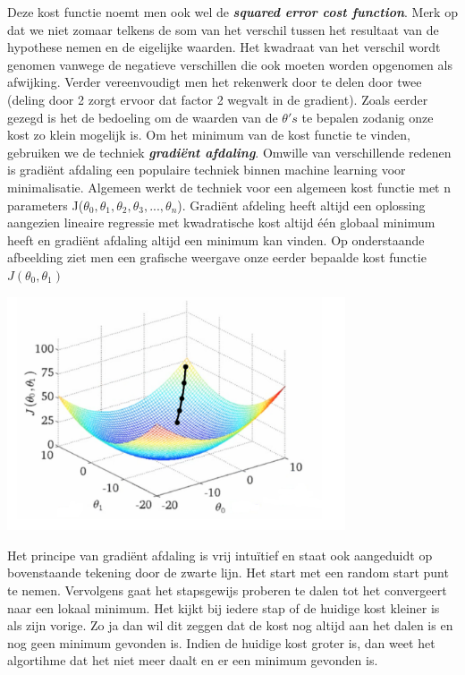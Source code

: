Deze kost functie noemt men ook wel de \textbf{\textit{squared error cost function}}. Merk op dat we niet zomaar telkens de som van het verschil tussen het resultaat van de hypothese nemen en de eigelijke waarden. Het kwadraat van het verschil wordt genomen vanwege de negatieve verschillen die ook moeten worden opgenomen als afwijking. Verder vereenvoudigt men het rekenwerk door te delen door twee (deling door 2 zorgt ervoor dat factor 2 wegvalt in de gradient). 
\newline
Zoals eerder gezegd is het de bedoeling om de waarden van de $\theta's$ te bepalen zodanig onze kost zo klein mogelijk is. Om het minimum van de kost functie te vinden, gebruiken we de techniek \textbf{\textit{gradi\"ent afdaling}}. Omwille van verschillende redenen is gradi\"ent afdaling een populaire techniek binnen machine learning voor minimalisatie. Algemeen werkt de techniek voor een algemeen kost functie met n parameters J($\theta_{0},\theta_{1},\theta_{2},\theta_{3}, ... ,\theta_{n}$). Gradi\"ent afdeling heeft altijd een oplossing aangezien lineaire regressie met kwadratische kost altijd \'e\'en globaal minimum heeft en gradi\"ent afdaling altijd een minimum kan vinden.
Op onderstaande afbeelding ziet men een grafische weergave onze eerder bepaalde kost functie $J(\theta_{0},\theta_{1})$
\newline
\begin{center}
  \includegraphics[width=10cm]{3d_plot_1}
\end{center}
%
 Het principe van gradi\"ent afdaling is vrij intu\"itief en staat ook aangeduidt op bovenstaande tekening door de zwarte lijn. Het start met een random start punt te nemen. Vervolgens gaat het stapsgewijs proberen te dalen tot het convergeert naar een lokaal minimum. Het kijkt bij iedere stap of de huidige kost kleiner is als zijn vorige. Zo ja dan wil dit zeggen dat de kost nog altijd aan het dalen is en nog geen minimum gevonden is. Indien de huidige kost groter is, dan weet het algortihme dat het niet meer daalt en er een minimum gevonden is. 
